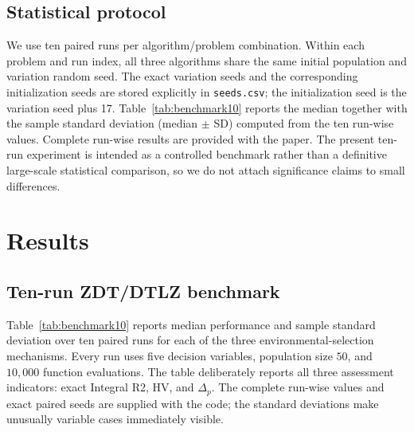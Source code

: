 \documentclass[runningheads]{llncs}
\begin{document}
\subsection{Statistical protocol}

We use ten paired runs per algorithm/problem combination. Within each problem and run index, all three algorithms share the same initial population and variation random seed. The exact variation seeds and the corresponding initialization seeds are stored explicitly in \texttt{seeds.csv}; the initialization seed is the variation seed plus 17. Table~\ref{tab:benchmark10} reports the median together with the sample standard deviation (median $\pm$ SD) computed from the ten run-wise values. Complete run-wise results are provided with the paper. The present ten-run experiment is intended as a controlled benchmark rather than a definitive large-scale statistical comparison, so we do not attach significance claims to small differences.

\section{Results}
\label{sec:results}

\subsection{Ten-run ZDT/DTLZ benchmark}

Table~\ref{tab:benchmark10} reports median performance and sample standard deviation over ten paired runs for each of the three environmental-selection mechanisms. Every run uses five decision variables, population size $50$, and $10{,}000$ function evaluations. The table deliberately reports all three assessment indicators: exact Integral R2, HV, and $\Delta_p$. The complete run-wise values and exact paired seeds are supplied with the code; the standard deviations make unusually variable cases immediately visible.
\end{document}
